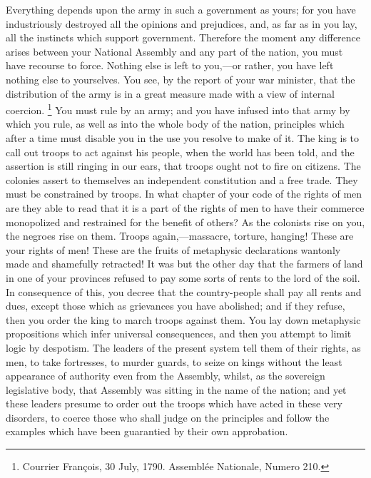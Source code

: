 Everything depends upon the army in such a government as yours; for you have industriously destroyed all the opinions and prejudices, and, as far as in you lay, all the instincts which support government. Therefore the moment any difference arises between your National Assembly and any part of the nation, you must have recourse to force. Nothing else is left to you,—or rather, you have left nothing else to yourselves. You see, by the report of your war minister, that the distribution of the army is in a great measure made with a view of internal coercion.
\footnote{ Courrier François, 30 July, 1790. Assemblée Nationale, Numero 210.}
 You must rule by an army; and you have infused into that army by which you rule, as well as into the whole body of the nation, principles which after a time must disable you in the use you resolve to make of it. The king is to call out troops to act against his people, when the world has been told, and the assertion is still ringing in our ears, that troops ought not to fire on citizens. The colonies assert to themselves an independent constitution and a free trade. They must be constrained by troops. In what chapter of your code of the rights of men are they able to read that it is a part of the rights of men to have their commerce monopolized and restrained for the benefit of others? As the colonists rise on you, the negroes rise on them. Troops again,—massacre, torture, hanging! These are your rights of men! These are the fruits of metaphysic declarations wantonly made and shamefully retracted! It was but the other day that the farmers of land in one of your provinces refused to pay some sorts of rents to the lord of the soil. In consequence of this, you decree that the country-people shall pay all rents and dues, except those which as grievances you have abolished; and if they refuse, then you order the king to march troops against them. You lay down metaphysic propositions which infer universal consequences, and then you attempt to limit logic by despotism. The leaders of the present system tell them of their rights, as men, to take fortresses, to murder guards, to seize on kings without the least appearance of authority even from the Assembly, whilst, as the sovereign legislative body, that Assembly was sitting in the name of the nation; and yet these leaders presume to order out the troops which have acted in these very disorders, to coerce those who shall judge on the principles and follow the examples which have been guarantied by their own approbation.

